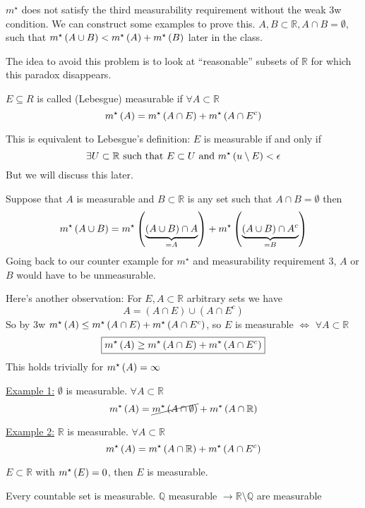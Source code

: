 $m^{\star}$ does not satisfy the third measurability requirement without the weak 3w condition.
We can construct some examples to prove this.
$A, B \subset \mathbb{R}, A \cap B = \emptyset$, such that $m^{\star}\left(A \cup B\right) < m^{\star}\left(A\right) + m^{\star}\left(B\right)$ later in the class.

The idea to avoid this problem is to look at ``reasonable'' subsets of $\mathbb{R}$ for which this paradox disappears.

\begin{definition}
    $E \subseteq R$ is called (Lebesgue) measurable if $\forall A \subset \mathbb{R}$
    \[
        m^{\star}\left(A\right) = m^{\star}\left(A \cap E\right) + m^{\star}\left(A \cap E^c\right)
    \]
\end{definition}
\begin{remark}
    This is equivalent to Lebesgue's definition: $E$ is measurable if and only if
    \[
        \exists U \subset \mathbb{R} \text{ such that } E \subset U \text{ and } m^{\star}\left(u \setminus E\right) < \epsilon
    \]
    But we will discuss this later.
\end{remark}

Suppose that $A$ is measurable and $B \subset \mathbb{R}$ is any set such that $A \cap B = \emptyset$ then
\[
    m^{\star}\left(A \cup B\right) = m^{\star}\left(\underbrace{(A \cup B) \cap A}_{=A}\right) + m^{\star}\left(\underbrace{(A \cup B) \cap A^{c}}_{=B}\right)
\]
Going back to our counter example for $m^{\star}$ and measurability requirement 3, $A$ or $B$ would have to be unmeasurable.

Here's another observation: For $E, A \subset \mathbb{R}$ arbitrary sets we have
\[
    A = (A \cap E) \cup (A \cap E^{c})
\]
So by 3w $m^{\star}\left(A\right) \leq m^{\star}\left(A \cap E\right) + m^{\star}\left(A \cap E^{c}\right)$, so $E$ is measurable $\iff$ $\forall A \subset \mathbb{R}$
\[
    \boxed{m^{\star}\left(A\right) \geq m^{\star}\left(A \cap E\right) + m^{\star}\left(A \cap E^{c}\right)}
\]
This holds trivially for $m^{\star}\left(A\right) = \infty$

\underline{Example 1:} $\emptyset$ is measurable.
$\forall A \subset \mathbb{R}$
\[
    m^{\star}\left(A\right) = \cancel{m^{\star}\left(A \cap \emptyset\right)} + m^{\star}\left(A \cap \mathbb{R}\right)
\]

\underline{Example 2:} $\mathbb{R}$ is measurable.
$\forall A \subset \mathbb{R}$
\[
    m^{\star}\left(A\right) = m^{\star}\left(A \cap \mathbb{R}\right) + m^{\star}\left(A \cap E^{c}\right)
\]

\begin{prop}
    $E \subset \mathbb{R}$ with $m^{\star}\left(E\right) = 0$, then $E$ is measurable.
\end{prop}

\begin{*corollary}
    Every countable set is measurable.
    $\mathbb{Q}$ measurable $\rightarrow \mathbb{R} \setminus \mathbb{Q}$ are measurable
\end{*corollary}

